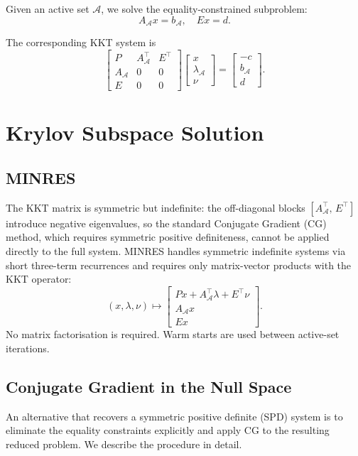 \documentclass[11pt]{article}
\begin{document}
Given an active set \(\mathcal{A}\), we solve the equality-constrained subproblem:
\[
A_\mathcal{A} x = b_\mathcal{A}, \quad E x = d.
\]

The corresponding KKT system is
\[
\begin{bmatrix}
P & A_\mathcal{A}^\top & E^\top \\
A_\mathcal{A} & 0 & 0 \\
E & 0 & 0
\end{bmatrix}
\begin{bmatrix}
x \\ \lambda_\mathcal{A} \\ \nu
\end{bmatrix}
=
\begin{bmatrix}
- c \\ b_\mathcal{A} \\ d
\end{bmatrix}.
\]

\section{Krylov Subspace Solution}

\subsection{MINRES}

The KKT matrix is symmetric but indefinite: the off-diagonal blocks
$[A_\mathcal{A}^\top,\, E^\top]$ introduce negative eigenvalues, so the standard
Conjugate Gradient (CG) method, which requires symmetric positive definiteness, cannot
be applied directly to the full system. MINRES handles symmetric indefinite systems via
short three-term recurrences and requires only matrix-vector products with the KKT
operator:
\[
(x, \lambda, \nu) \mapsto
\begin{bmatrix}
P x + A_\mathcal{A}^\top \lambda + E^\top \nu \\
A_\mathcal{A} x \\
E x
\end{bmatrix}.
\]
No matrix factorisation is required. Warm starts are used between active-set iterations.

\subsection{Conjugate Gradient in the Null Space}

An alternative that recovers a symmetric positive definite (SPD) system is to eliminate
the equality constraints explicitly and apply CG to the resulting reduced problem. We
describe the procedure in detail.
\end{document}
